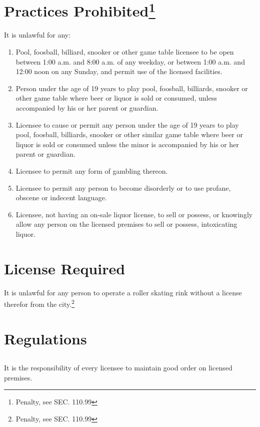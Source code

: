 \section{Practices Prohibited\footnote{Penalty, see SEC. 110.99}}
It is unlawful for any:
\begin{enumerate}[{\indent}A)]
    \item Pool, foosball, billiard, snooker or other game table licensee to be open between 1:00 a.m. and 8:00 a.m. of any weekday, or between 1:00 a.m. and 12:00 noon on any Sunday, and permit use of the licensed facilities.
    \item Person under the age of 19 years to play pool, foosball, billiards, snooker or other game table where beer or liquor is sold or consumed, unless accompanied by his or her parent or guardian.
    \item Licensee to cause or permit any person under the age of 19 years to play pool, foosball, billiards, snooker or other similar game table where beer or liquor is sold or consumed unless the minor is accompanied by his or her parent or guardian.
    \item Licensee to permit any form of gambling thereon.
    \item Licensee to permit any person to become disorderly or to use profane, obscene or indecent language.
    \item Licensee, not having an on-sale liquor license, to sell or possess, or knowingly allow any person on the licensed premises to sell or possess, intoxicating liquor.
\end{enumerate}


\setcounter{section}{59}
\section{License Required}
It is unlawful for any person to operate a roller skating rink without a license therefor from the city.\footnote{Penalty, see SEC. 110.99}

\section{Regulations}
\subsection{}
It is the responsibility of every licensee to maintain good order on licensed premises.
